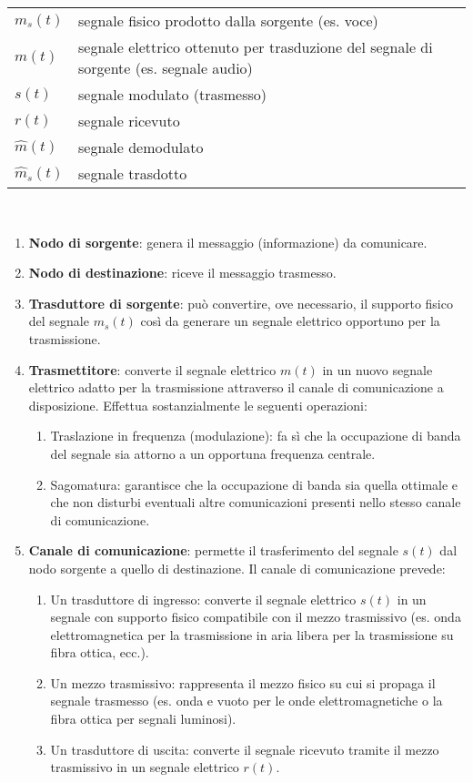 \documentclass{article}
\begin{document}
\begin{tabular}{ll}
    $m_s(t)$ & segnale fisico prodotto dalla sorgente (es. voce) \\
    $m(t)$ & segnale elettrico ottenuto per trasduzione del segnale di sorgente (es. segnale audio) \\
    $s(t)$ & segnale modulato (trasmesso) \\
    $r(t)$ & segnale ricevuto \\
    $\hat{m}(t)$ & segnale demodulato \\
    $\hat{m}_s(t)$ & segnale trasdotto \\
\end{tabular}
\\
\begin{enumerate}
\item \textbf{Nodo di sorgente}: genera il messaggio (informazione) da comunicare.
\item \textbf{Nodo di destinazione}: riceve il messaggio trasmesso.
\item \textbf{Trasduttore di sorgente}: può convertire, ove necessario, il supporto fisico del segnale $m_s(t)$ così da generare un segnale elettrico opportuno per la trasmissione.



\item \textbf{Trasmettitore}: converte il segnale elettrico \( m(t) \) in un nuovo segnale elettrico adatto per la trasmissione attraverso il canale di comunicazione a disposizione. Effettua sostanzialmente le seguenti operazioni:
\begin{enumerate}
    \item Traslazione in frequenza (modulazione): fa sì che la occupazione di banda del segnale sia attorno a un opportuna frequenza centrale.
    \item Sagomatura: garantisce che la occupazione di banda sia quella ottimale e che non disturbi eventuali altre comunicazioni presenti nello stesso canale di comunicazione.
\end{enumerate}

\item \textbf{Canale di comunicazione}: permette il trasferimento del segnale \( s(t) \) dal nodo sorgente a quello di destinazione. Il canale di comunicazione prevede:
\begin{enumerate}
    \item Un trasduttore di ingresso: converte il segnale elettrico \( s(t) \) in un segnale con supporto fisico compatibile con il mezzo trasmissivo (es. onda elettromagnetica per la trasmissione in aria libera per la trasmissione su fibra ottica, ecc.).
    \item Un mezzo trasmissivo: rappresenta il mezzo fisico su cui si propaga il segnale trasmesso (es. onda e vuoto per le onde elettromagnetiche o la fibra ottica per segnali luminosi).
    \item Un trasduttore di uscita: converte il segnale ricevuto tramite il mezzo trasmissivo in un segnale elettrico \( r(t) \).
\end{enumerate}


\end{enumerate}
\end{document}
